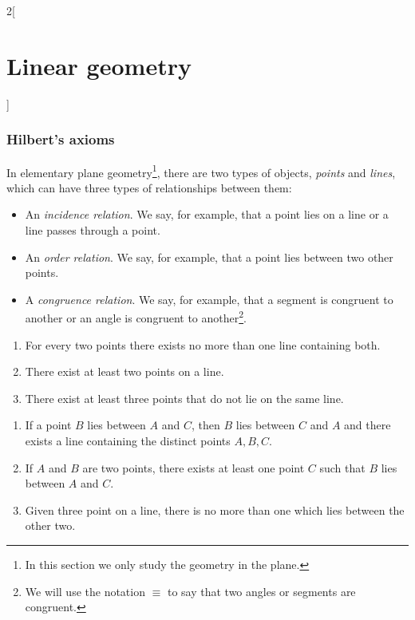 \documentclass[../../../main.tex]{subfiles}
\begin{document}
\begin{multicols}{2}[\section{Linear geometry}]
    \subsubsection{Hilbert's axioms}
    \begin{definition}
        In elementary plane geometry\footnote{In this section we only study the geometry in the plane.}, there are two types of objects, \textit{points} and \textit{lines}, which can have three types of relationships between them:
        \begin{itemize}
            \item An \textit{incidence relation}. We say, for example, that a point lies on a line or a line passes through a point.
            \item An \textit{order relation}. We say, for example, that a point lies between two other points.
            \item A \textit{congruence relation}. We say, for example, that a segment is congruent to another or an angle is congruent to another\footnote{We will use the notation $\equiv$ to say that two angles or segments are congruent.}.
        \end{itemize}
    \end{definition}
    \begin{axiom}\label{LG_incidence}
        \hfill
        \begin{enumerate}
            \item For every two points there exists no more than one line containing both.
            \item There exist at least two points on a line.
            \item There exist at least three points that do not lie on the same line.
        \end{enumerate}
    \end{axiom}
    \begin{axiom}\label{LG_order}
        \hfill
        \begin{enumerate}
            \item If a point $B$ lies between $A$ and $C$, then $B$ lies between $C$ and $A$ and there exists a line containing the distinct points $A,B,C$.
            \item If $A$ and $B$ are two points, there exists at least one point $C$ such that $B$ lies between $A$ and $C$.
            \item Given three point on a line, there is no more than one which lies between the other two.

\end{enumerate}
\end{axiom}
\end{multicols}
\end{document}
